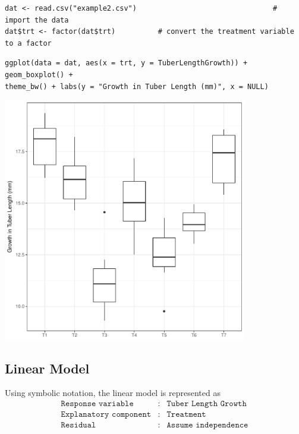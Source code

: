 \documentclass[a4paper, 10pt, fleqn, twosided]{memoir}
\begin{document}
\begin{tcolorbox}[title = Import and graph the data]
\begin{verbatim}
dat <- read.csv("example2.csv")                                # import the data
dat$trt <- factor(dat$trt)          # convert the treatment variable to a factor
\end{verbatim}
\tcblower
\begin{verbatim}
ggplot(data = dat, aes(x = trt, y = TuberLengthGrowth)) + geom_boxplot() +
theme_bw() + labs(y = "Growth in Tuber Length (mm)", x = NULL)
\end{verbatim}
\end{tcolorbox}

\begin{tcolorbox}[title = Example 2 Boxplots of growth in tuber length for the treatments]
\includegraphics[width=0.8\textwidth, frame]{example2_boxplot.pdf}
\end{tcolorbox}
\clearpage
\subsection{Linear Model}

Using symbolic notation, the linear model is represented  as
\begin{eqnarray*}
	\texttt{Response variable}&:& \texttt{Tuber Length Growth} \\
	\texttt{Explanatory component}&:& \texttt{Treatment}\\
	\texttt{Residual}&:& \texttt{Assume independence}
\end{eqnarray*}
\end{document}

